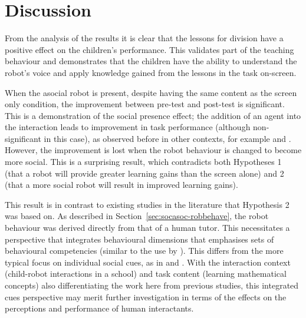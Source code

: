\section{Discussion}\label{sec:social-discussion}
From the analysis of the results it is clear that the lessons for division have a positive effect on the children's performance. This validates part of the teaching behaviour and demonstrates that the children have the ability to understand the robot's voice and apply knowledge gained from the lessons in the task on-screen.

When the asocial robot is present, despite having the same content as the screen only condition, the improvement between pre-test and post-test is significant. This is a demonstration of the social presence effect; the addition of an agent into the interaction leads to improvement in task performance (although non-significant in this case), as observed before in other contexts, for example \citet{kose2009effects} and \citet{leyzberg2012physical}. However, the improvement is lost when the robot behaviour is changed to become more social. This is a surprising result, which contradicts both Hypotheses 1 (that a robot will provide greater \gls{learning} gains than the screen alone) and 2 (that a more social robot will result in improved \gls{learning} gains).

This result is in contrast to existing studies in the literature that Hypothesis 2 was based on. As described in Section~\ref{sec:socasoc-robbehave}, the robot behaviour was derived directly from that of a human tutor. This necessitates a perspective that integrates behavioural dimensions \citep{zaki2013cue} that emphasises sets of behavioural competencies (similar to the use by \citealt{saerbeck2010expressive}). This differs from the more typical focus on individual social cues, as in \citet{mayer2004personalization} and \citet{szafir2012pay}. With the interaction context (child-robot interactions in a school) and task content (learning mathematical concepts) also differentiating the work here from previous studies, this integrated cues perspective may merit further investigation in terms of the effects on the perceptions and performance of human interactants.

